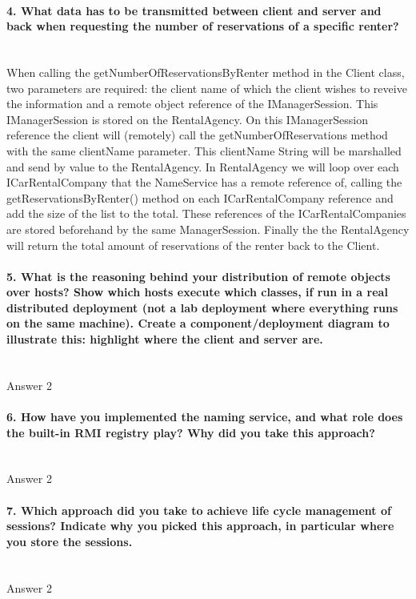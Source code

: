 \documentclass{ds-report}
\begin{document}
	\paragraph{4. What data has to be transmitted between client and server and back when requesting the number
of reservations of a specific renter?} \mbox{}\\
	When calling the getNumberOfReservationsByRenter method in the Client class, two parameters are required: the client name of which the client wishes to reveive the information and a remote object reference of the IManagerSession. This IManagerSession is stored on the RentalAgency. On this IManagerSession reference the client will (remotely) call the getNumberOfReservations method with the same clientName parameter. This clientName String will be marshalled and send by value to the RentalAgency. 
In RentalAgency we will loop over each ICarRentalCompany that the NameService has a remote reference of, calling the getReservationsByRenter() method on each ICarRentalCompany reference and add the size of the list to the total. These references of the ICarRentalCompanies are stored beforehand by the same ManagerSession. 
Finally the the RentalAgency will return the total amount of reservations of the renter back to the Client.

	\paragraph{5. What is the reasoning behind your distribution of remote objects over hosts? Show which
hosts execute which classes, if run in a real distributed deployment (not a lab deployment where
everything runs on the same machine). Create a component/deployment diagram to illustrate this:
highlight where the client and server are.} \mbox{}\\
	Answer 2

	\paragraph{6. How have you implemented the naming service, and what role does the built-in RMI registry play?
Why did you take this approach?} \mbox{}\\
	Answer 2

	\paragraph{7. Which approach did you take to achieve life cycle management of sessions? Indicate why you
picked this approach, in particular where you store the sessions.} \mbox{}\\
	Answer 2
\end{document}
